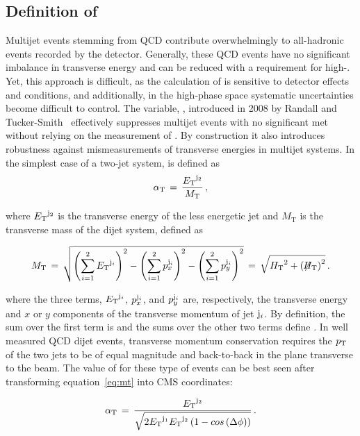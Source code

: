 \clearpage
\subsection{Definition of \texorpdfstring{\alphat}{AlphaT}\label{sec:alphat}}

Multijet events stemming from QCD contribute overwhelmingly to
all-hadronic events recorded by the detector. Generally, these QCD events
have no significant imbalance in transverse energy and can 
be reduced with a requirement for high-\met. Yet, this approach is difficult, 
as the calculation of \met is sensitive to detector effects and conditions, 
and additionally, in the high-\met phase space systematic uncertainties become difficult
to control. The variable, \alphat, introduced in 2008 by Randall and 
Tucker-Smith~\cite{Randall:2008rw} effectively suppresses multijet 
events with no significant met without relying on the measurement
of \met. By construction it also introduces robustness against mismeasurements 
of transverse energies in multijet systems.  In the simplest case of a two-jet system,
\alphat is defined as
\begin{equation}
\label{eq:alphat}
\alpha_{\text{T}}\, =\, \frac{{E_{\text T}}^{{\rm j}_2}}{M_\text{T}} \, ,
\end{equation}

where ${E_{\text T}}^{\rm j_2}$ is the transverse energy of the less energetic
jet and $M_\text{T}$ is the transverse mass of the dijet system,
defined as

\begin{equation}
  \label{eq:mt}
  M_\text{T}\, = \,\sqrt{ \left( \sum_{i=1}^2 {E_{\text T}}^{{\rm j}_i}
    \right)^2 - \left( \sum_{i=1}^2 p_x^{{\rm j}_i} \right)^2 - \left(
      \sum_{i=1}^2 p_y^{{\rm j}_i} \right)^2} \, = \,\sqrt{\mbox{$H_\text{T}$}^2 + \left(\mbox{$\not\!\!H_\text{T}$}\right)^2} \,  .
\end{equation}

where the three terms, ${E_{\text T}}^{{\rm j}_i}$, $p_x^{{\rm j}_i}$, and $p_y^{{\rm j}_i}$ are,
respectively, the transverse energy and $x$ or $y$ components of the
transverse momentum of jet ${\rm j}_i$. By definition, the sum over the first term is
\scalht and the sums over the other two terms define \mht.  In well 
measured QCD dijet events, transverse momentum conservation requires 
the $p_{\mathrm{T}}$ of the two jets to be of equal magnitude and back-to-back 
in the plane transverse to the beam. The value of \alphat for these 
type of events can be best seen after transforming 
equation~\ref{eq:mt} into CMS coordinates:

\begin{equation}
  \label{eq:mt-polar}
  \alpha_{\text{T}}\, = \,\frac{{E_{\text T}}^{{\rm j}_2}}{\sqrt{2{E_{\text T}}^{{\rm j}_1}
   {E_{\text T}}^{{\rm j}_2} \left(1-cos\left(\Delta\phi\right)\right)}}\, .
\end{equation}

